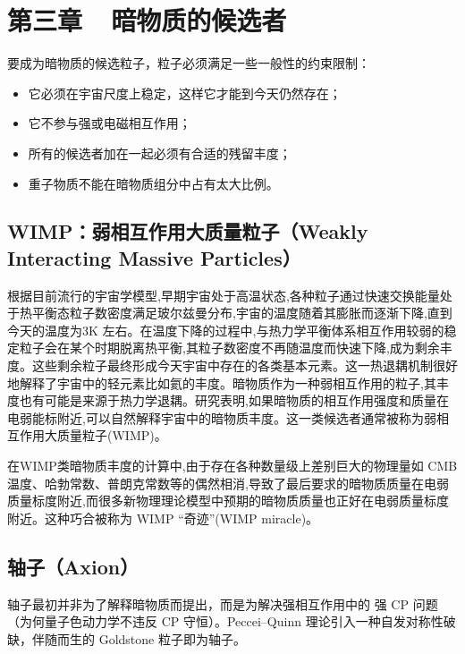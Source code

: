 \section*{第三章~~暗物质的候选者}
\setcounter{section}{3} \setcounter{subsection}{0} 
\setcounter{table}{0} \setcounter{figure}{0} \setcounter{equation}{0}

要成为暗物质的候选粒子，粒子必须满足一些一般性的约束限制：

\begin{itemize}
    \item 它必须在宇宙尺度上稳定，这样它才能到今天仍然存在；
    \item 它不参与强或电磁相互作用；
    \item 所有的候选者加在一起必须有合适的残留丰度；
    \item 重子物质不能在暗物质组分中占有太大比例。
\end{itemize}

\subsection{WIMP：弱相互作用大质量粒子（Weakly Interacting Massive Particles）}

根据目前流行的宇宙学模型,早期宇宙处于高温状态,各种粒子通过快速交换能量处于热平衡态粒子数密度满足玻尔兹曼分布,宇宙的温度随着其膨胀而逐渐下降,直到今天的温度为3K 左右。在温度下降的过程中,与热力学平衡体系相互作用较弱的稳定粒子会在某个时期脱离热平衡,其粒子数密度不再随温度而快速下降,成为剩余丰度。这些剩余粒子最终形成今天宇宙中存在的各类基本元素。这一热退耦机制很好地解释了宇宙中的轻元素比如氦的丰度。暗物质作为一种弱相互作用的粒子,其丰度也有可能是来源于热力学退耦。研究表明,如果暗物质的相互作用强度和质量在电弱能标附近,可以自然解释宇宙中的暗物质丰度。这一类候选者通常被称为弱相互作用大质量粒子(WIMP)。\cite{周宇峰2011暗物质问题简介}

在WIMP类暗物质丰度的计算中,由于存在各种数量级上差别巨大的物理量如 CMB温度、哈勃常数、普朗克常数等的偶然相消,导致了最后要求的暗物质质量在电弱质量标度附近,而很多新物理理论模型中预期的暗物质质量也正好在电弱质量标度附近。这种巧合被称为 WIMP “奇迹”(WIMP miracle)。

\subsection{轴子（Axion）}

轴子最初并非为了解释暗物质而提出，而是为解决强相互作用中的 强 CP 问题（为何量子色动力学不违反 CP 守恒）。Peccei–Quinn 理论引入一种自发对称性破缺，伴随而生的 Goldstone 粒子即为轴子。

